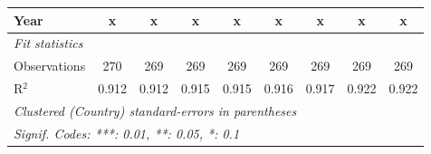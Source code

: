 \begin{table}[htbp]
\begin{tabular}{lcccccccc}
      Year                                      & x             & x            & x             & x            & x             & x             & x             & x\\  
      \midrule \emph{Fit statistics}\\
      Observations                              & 270           & 269          & 269           & 269          & 269           & 269           & 269           & 269\\  
      R$^2$                                     & 0.912         & 0.912        & 0.915         & 0.915        & 0.916         & 0.917         & 0.922         & 0.922\\  
      \midrule
      \multicolumn{9}{l}{\emph{Clustered (Country) standard-errors in parentheses}}\\
      \multicolumn{9}{l}{\emph{Signif. Codes: ***: 0.01, **: 0.05, *: 0.1}}\\
   \end{tabular}
\end{table}


